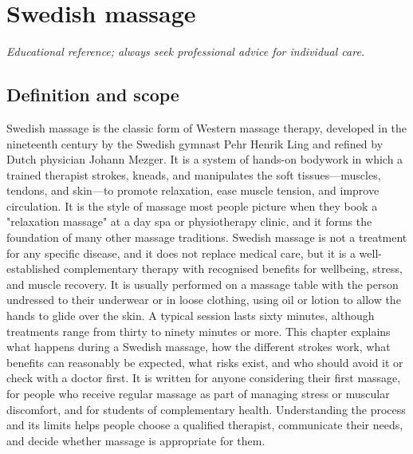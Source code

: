 \chapter{Swedish massage}

\medskip
\noindent\textit{Educational reference; always seek professional advice for individual care.}

\section*{Definition and scope}
Swedish massage is the classic form of Western massage therapy, developed in the nineteenth century by the Swedish gymnast Pehr Henrik Ling and refined by Dutch physician Johann Mezger. It is a system of hands-on bodywork in which a trained therapist strokes, kneads, and manipulates the soft tissues---muscles, tendons, and skin---to promote relaxation, ease muscle tension, and improve circulation. It is the style of massage most people picture when they book a "relaxation massage" at a day spa or physiotherapy clinic, and it forms the foundation of many other massage traditions. Swedish massage is not a treatment for any specific disease, and it does not replace medical care, but it is a well-established complementary therapy with recognised benefits for wellbeing, stress, and muscle recovery. It is usually performed on a massage table with the person undressed to their underwear or in loose clothing, using oil or lotion to allow the hands to glide over the skin. A typical session lasts sixty minutes, although treatments range from thirty to ninety minutes or more. This chapter explains what happens during a Swedish massage, how the different strokes work, what benefits can reasonably be expected, what risks exist, and who should avoid it or check with a doctor first. It is written for anyone considering their first massage, for people who receive regular massage as part of managing stress or muscular discomfort, and for students of complementary health. Understanding the process and its limits helps people choose a qualified therapist, communicate their needs, and decide whether massage is appropriate for them.

